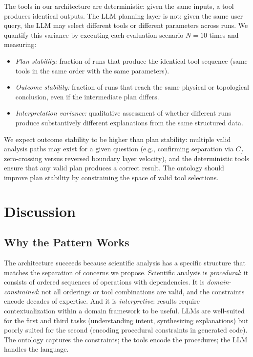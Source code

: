 \documentclass{vgtc}                          %
\begin{document}
The tools in our architecture are deterministic: given the same inputs, a tool
produces identical outputs.
The LLM planning layer is not: given the same user query, the LLM may select
different tools or different parameters across runs.
We quantify this variance by executing each evaluation scenario $N=10$ times
and measuring:
\begin{itemize}
\item \textit{Plan stability:} fraction of runs that produce the identical tool
sequence (same tools in the same order with the same parameters).
\item \textit{Outcome stability:} fraction of runs that reach the same physical
or topological conclusion, even if the intermediate plan differs.
\item \textit{Interpretation variance:} qualitative assessment of whether
different runs produce substantively different explanations from the same
structured data.
\end{itemize}

We expect outcome stability to be higher than plan stability: multiple valid
analysis paths may exist for a given question (e.g., confirming separation via
$C_f$ zero-crossing versus reversed boundary layer velocity), and the
deterministic tools ensure that any valid plan produces a correct result.
The ontology should improve plan stability by constraining the space of valid
tool selections.



\section{Discussion}

\subsection{Why the Pattern Works}

The architecture succeeds because scientific analysis has a specific structure
that matches the separation of concerns we propose.
Scientific analysis is \textit{procedural}: it consists of ordered sequences of
operations with dependencies.
It is \textit{domain-constrained}: not all orderings or tool combinations are
valid, and the constraints encode decades of expertise.
And it is \textit{interpretive}: results require contextualization within a
domain framework to be useful.
LLMs are well-suited for the first and third tasks (understanding intent,
synthesizing explanations) but poorly suited for the second (encoding procedural
constraints in generated code).
The ontology captures the constraints; the tools encode the procedures; the LLM
handles the language.
\end{document}
